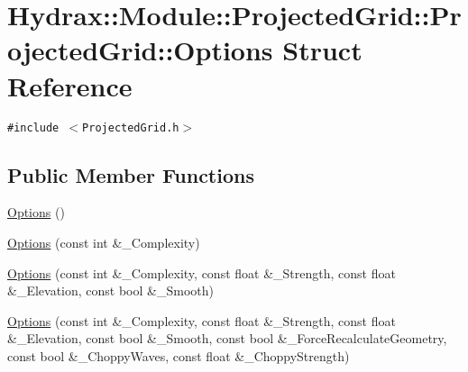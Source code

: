 \hypertarget{struct_hydrax_1_1_module_1_1_projected_grid_1_1_options}{
\section{Hydrax::Module::ProjectedGrid::ProjectedGrid::Options Struct Reference}
\label{struct_hydrax_1_1_module_1_1_projected_grid_1_1_options}
}
{\tt \#include $<$ProjectedGrid.h$>$}

\subsection*{Public Member Functions}
\begin{CompactItemize}
\item 
\hyperlink{struct_hydrax_1_1_module_1_1_projected_grid_1_1_options_18aba976dbc90be89d1d4bd464f8d877}{Options} ()
\item 
\hyperlink{struct_hydrax_1_1_module_1_1_projected_grid_1_1_options_1c68747eb19c420f6b85fc4806b7c341}{Options} (const int \&\_\-Complexity)
\item 
\hyperlink{struct_hydrax_1_1_module_1_1_projected_grid_1_1_options_3c7e63596f51adb9435fcd88e9bde2b7}{Options} (const int \&\_\-Complexity, const float \&\_\-Strength, const float \&\_\-Elevation, const bool \&\_\-Smooth)
\item 
\hyperlink{struct_hydrax_1_1_module_1_1_projected_grid_1_1_options_bd3aaa3c56a7347a6c911e0c57b62be4}{Options} (const int \&\_\-Complexity, const float \&\_\-Strength, const float \&\_\-Elevation, const bool \&\_\-Smooth, const bool \&\_\-ForceRecalculateGeometry, const bool \&\_\-ChoppyWaves, const float \&\_\-ChoppyStrength)
\end{CompactItemize}
